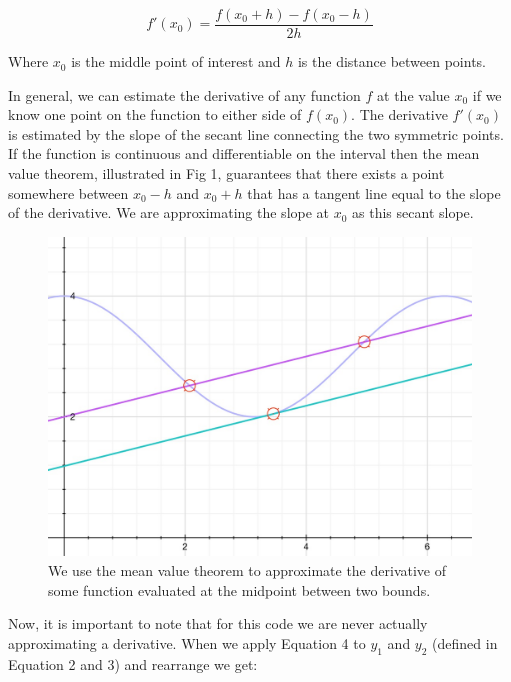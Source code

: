 \documentclass[11pt]{amsart}
\begin{document}
\begin{equation}
f \prime (x_0) = \frac{f(x_0 + h) - f(x_0 - h)}{2h}
\end{equation}
\vspace{2 mm}

Where $x_0$ is the middle point of interest and $h$ is the distance between points.
\newline

In general, we can estimate the derivative of any function $f$ at the value $x_0$ if we know one point on the function to either side of $f(x_0)$.  The derivative $f \prime (x_0)$ is estimated by the slope of the secant line connecting the two symmetric points.  If the function is continuous and differentiable on the interval then the mean value theorem, illustrated in Fig 1, guarantees that there exists a point somewhere between $x_0 - h$ and $x_0 +h$ that has a tangent line equal to the slope of the derivative.  We are approximating the slope at  $x_0$ as this secant slope.
\newline

\begin{figure}[ht!]
\centering
\includegraphics[width=120mm]{MeanValueTheorem.jpg}
\caption{We use the mean value theorem to approximate the derivative of some function evaluated at the midpoint between two bounds.}
\label{overflow}
\end{figure}

\vspace{3 mm}

Now, it is important to note that for this code we are never actually approximating a derivative.  When we apply Equation 4 to $y_1$ and $y_2$ (defined in Equation 2 and 3) and rearrange we get:
\end{document}
